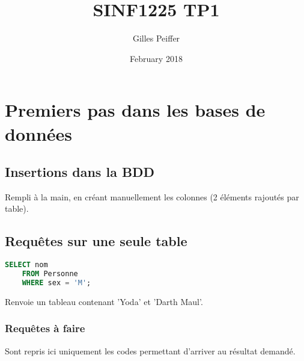 \documentclass{article}
\title{SINF1225 TP1}
\author{Gilles Peiffer}
\date{February 2018}
\begin{document}
\maketitle

\section{Premiers pas dans les bases de données}
\subsection{Insertions dans la BDD}

    Rempli à la main, en créant manuellement les colonnes (2 éléments rajoutés par table).

\subsection{Requêtes sur une seule table}

    \begin{lstlisting}[language=SQL]
    SELECT nom
    FROM Personne
    WHERE sex = 'M'; \end{lstlisting}

    Renvoie un tableau contenant 'Yoda' et 'Darth Maul'.

\subsubsection{Requêtes à faire}

    Sont repris ici uniquement les codes permettant d'arriver au résultat demandé.
\end{document}

